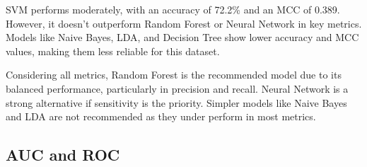 \documentclass[12pt,a4paper]{article}
\begin{document}
	SVM performs moderately, with an accuracy of 72.2\% and an MCC of 0.389. However, it doesn't outperform Random Forest or Neural Network in key metrics. Models like Naive Bayes, LDA, and Decision Tree show lower accuracy and MCC values, making them less reliable for this dataset.
	
	Considering all metrics, Random Forest is the recommended model due to its balanced performance, particularly in precision and recall. Neural Network is a strong alternative if sensitivity is the priority. Simpler models like Naive Bayes and LDA are not recommended as they under perform in most metrics.

	\subsection{AUC and ROC}
	
\end{document}
